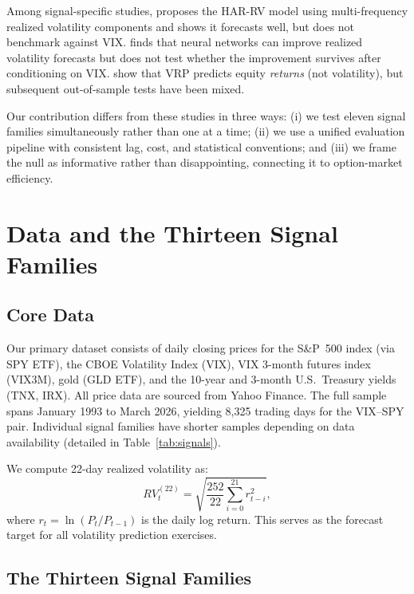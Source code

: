 \documentclass[12pt,a4paper]{article}
\begin{document}
Among signal-specific studies, \citet{corsi2009} proposes the HAR-RV model using multi-frequency realized volatility components and shows it forecasts well, but does not benchmark against VIX. \citet{bucci2020} finds that neural networks can improve realized volatility forecasts but does not test whether the improvement survives after conditioning on VIX. \citet{bollerslev2009} show that VRP predicts equity \emph{returns} (not volatility), but subsequent out-of-sample tests have been mixed.

Our contribution differs from these studies in three ways: (i) we test eleven signal families simultaneously rather than one at a time; (ii) we use a unified evaluation pipeline with consistent lag, cost, and statistical conventions; and (iii) we frame the null as informative rather than disappointing, connecting it to option-market efficiency.


\section{Data and the Thirteen Signal Families}
\label{sec:data}

\subsection{Core Data}

Our primary dataset consists of daily closing prices for the S\&P~500 index (via SPY ETF), the CBOE Volatility Index (VIX), VIX 3-month futures index (VIX3M), gold (GLD ETF), and the 10-year and 3-month U.S.\ Treasury yields (TNX, IRX). All price data are sourced from Yahoo Finance. The full sample spans January 1993 to March 2026, yielding 8,325 trading days for the VIX--SPY pair. Individual signal families have shorter samples depending on data availability (detailed in Table~\ref{tab:signals}).

We compute 22-day realized volatility as:
\begin{equation}
RV_{t}^{(22)} = \sqrt{\frac{252}{22} \sum_{i=0}^{21} r_{t-i}^2},
\label{eq:rv}
\end{equation}
where $r_t = \ln(P_t/P_{t-1})$ is the daily log return. This serves as the forecast target for all volatility prediction exercises.

\subsection{The Thirteen Signal Families}
\end{document}
